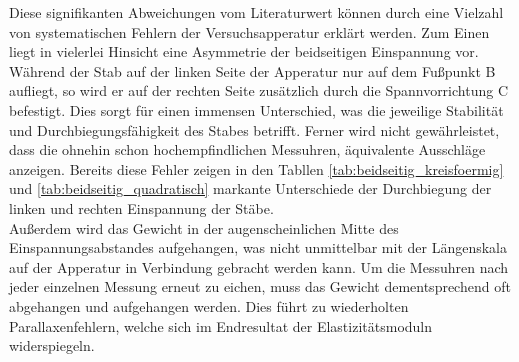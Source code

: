 \noindent
Diese signifikanten Abweichungen vom Literaturwert können durch eine Vielzahl von systematischen Fehlern der Versuchsapperatur erklärt werden.
Zum Einen liegt in vielerlei Hinsicht eine Asymmetrie der beidseitigen Einspannung vor. Während der Stab auf der linken Seite der Apperatur nur auf dem
Fußpunkt B aufliegt, so wird er auf der rechten Seite zusätzlich durch die Spannvorrichtung C befestigt. Dies sorgt für einen immensen Unterschied,
was die jeweilige Stabilität und Durchbiegungsfähigkeit des Stabes betrifft. Ferner wird nicht gewährleistet, dass die ohnehin schon hochempfindlichen 
Messuhren, äquivalente Ausschläge anzeigen. Bereits diese Fehler zeigen in den Tabllen \ref{tab:beidseitig_kreisfoermig} und \ref{tab:beidseitig_quadratisch}
markante Unterschiede der Durchbiegung der linken und rechten Einspannung der Stäbe.\\
Außerdem wird das Gewicht in der augenscheinlichen Mitte des Einspannungsabstandes aufgehangen, was nicht unmittelbar mit der Längenskala auf der Apperatur
in Verbindung gebracht werden kann. Um die Messuhren nach jeder einzelnen Messung erneut zu eichen, muss das Gewicht dementsprechend oft abgehangen und aufgehangen 
werden. Dies führt zu wiederholten Parallaxenfehlern, welche sich im Endresultat der Elastizitätsmoduln widerspiegeln. 
%
